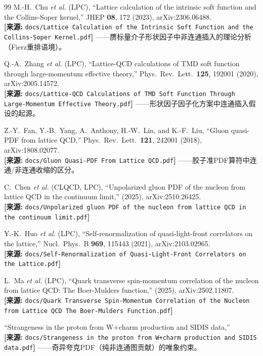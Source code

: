 \documentclass[12pt,a4paper]{ctexart}
\theoremstyle{definition}
\begin{document}
\begin{thebibliography}{99}
M.-H.~Chu \textit{et al.} (LPC),
``Lattice calculation of the intrinsic soft function and the Collins-Soper kernel,''
JHEP \textbf{08}, 172 (2023), arXiv:2306.06488.
\\\textbf{[来源:} \texttt{docs/Lattice Calculation of the Intrinsic Soft Function and the Collins-Soper Kernel.pdf}\textbf{]}
——赝标量介子形状因子中非连通插入的理论分析（Fierz重排语境）。

Q.-A.~Zhang \textit{et al.} (LPC),
``Lattice-QCD calculations of TMD soft function through large-momentum effective theory,''
Phys.\ Rev.\ Lett.\ \textbf{125}, 192001 (2020), arXiv:2005.14572.
\\\textbf{[来源:} \texttt{docs/Lattice-QCD Calculations of TMD Soft Function Through Large-Momentum Effective Theory.pdf}\textbf{]}
——形状因子因子化方案中连通插入假设的起源。

Z.-Y.~Fan, Y.-B.~Yang, A.~Anthony, H.-W.~Lin, and K.-F.~Liu,
``Gluon quasi-PDF from lattice QCD,''
Phys.\ Rev.\ Lett.\ \textbf{121}, 242001 (2018), arXiv:1808.02077.
\\\textbf{[来源:} \texttt{docs/Gluon Quasi-PDF From Lattice QCD.pdf}\textbf{]}
——胶子准PDF算符中连通/非连通收缩的区分。

C.~Chen \textit{et al.} (CLQCD, LPC),
``Unpolarized gluon PDF of the nucleon from lattice QCD in the continuum limit,''
(2025), arXiv:2510.26425.
\\\textbf{[来源:} \texttt{docs/Unpolarized gluon PDF of the nucleon from lattice QCD in the continuum limit.pdf}\textbf{]}

Y.-K.~Huo \textit{et al.} (LPC),
``Self-renormalization of quasi-light-front correlators on the lattice,''
Nucl.\ Phys.\ B \textbf{969}, 115443 (2021), arXiv:2103.02965.
\\\textbf{[来源:} \texttt{docs/Self-Renormalization of Quasi-Light-Front Correlators on the Lattice.pdf}\textbf{]}

L.~Ma \textit{et al.} (LPC),
``Quark transverse spin-momentum correlation of the nucleon from lattice QCD: The Boer-Mulders function,''
(2025), arXiv:2502.11807.
\\\textbf{[来源:} \texttt{docs/Quark Transverse Spin-Momentum Correlation of the Nucleon from Lattice QCD The Boer-Mulders Function.pdf}\textbf{]}

``Strangeness in the proton from W+charm production and SIDIS data,''
\\\textbf{[来源:} \texttt{docs/Strangeness in the proton from W+charm production and SIDIS data.pdf}\textbf{]}
——奇异夸克PDF（纯非连通图贡献）的唯象约束。


\end{thebibliography}
\end{document}
